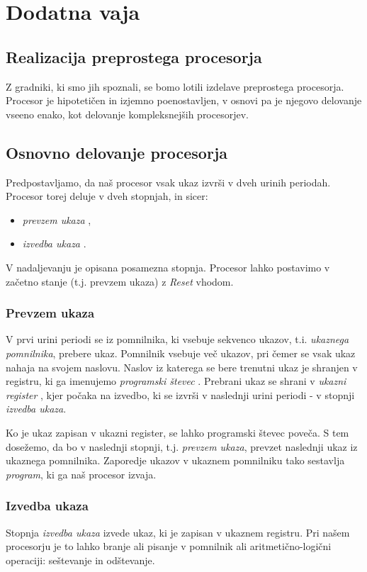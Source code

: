 \chapter{Dodatna vaja}
\section{Realizacija preprostega procesorja}

Z gradniki, ki smo jih spoznali, se bomo lotili izdelave preprostega procesorja. Procesor je hipotetičen in izjemno poenostavljen, v osnovi pa je njegovo delovanje vseeno enako, kot delovanje kompleksnejših procesorjev. 

\section{Osnovno delovanje procesorja}
Predpostavljamo, da naš procesor vsak ukaz izvrši v dveh urinih periodah. Procesor torej deluje v dveh stopnjah, in sicer:
\begin{itemize}
\item \emph{prevzem ukaza} ,
\item \emph{izvedba ukaza} .
\end{itemize}

V nadaljevanju je opisana posamezna stopnja. Procesor lahko postavimo v začetno stanje (t.j. prevzem ukaza) z \emph{Reset} vhodom.

\subsection{Prevzem ukaza}
V prvi urini periodi se iz pomnilnika, ki vsebuje sekvenco ukazov, t.i. \emph{ukaznega pomnilnika}, prebere ukaz. Pomnilnik vsebuje več ukazov, pri čemer se vsak ukaz nahaja na svojem naslovu. Naslov iz katerega se bere trenutni ukaz je shranjen v registru, ki ga imenujemo \emph{programski števec} . Prebrani ukaz se shrani v \emph{ukazni register} , kjer počaka na izvedbo, ki se izvrši v naslednji urini periodi - v stopnji \emph{izvedba ukaza}. 

Ko je ukaz zapisan v ukazni register, se lahko programski števec poveča. S tem dosežemo, da bo v naslednji stopnji, t.j. \emph{prevzem ukaza}, prevzet naslednji ukaz iz ukaznega pomnilnika. Zaporedje ukazov v ukaznem pomnilniku tako sestavlja \emph{program}, ki ga naš procesor izvaja.

\subsection{Izvedba ukaza}
Stopnja \emph{izvedba ukaza} izvede ukaz, ki je zapisan v ukaznem registru. Pri našem procesorju je to lahko branje ali pisanje v pomnilnik ali aritmetično-logični operaciji: seštevanje in odštevanje. 


